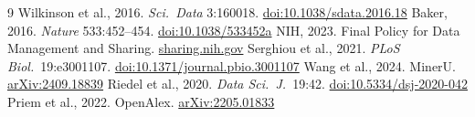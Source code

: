 \documentclass[a4paper,12pt]{article}
\begin{document}
\renewcommand{\refname}{\vspace{-0.5em}\normalsize References}
\renewcommand{\markboth}[2]{}
\begin{thebibliography}{9}\scriptsize\setlength{\itemsep}{1pt}\setlength{\parsep}{0pt}\setlength{\topsep}{0pt}
 Wilkinson et al., 2016. \textit{Sci.\ Data} 3:160018. \href{https://doi.org/10.1038/sdata.2016.18}{doi:10.1038/sdata.2016.18}
 Baker, 2016. \textit{Nature} 533:452--454. \href{https://doi.org/10.1038/533452a}{doi:10.1038/533452a}
 NIH, 2023. Final Policy for Data Management and Sharing. \href{https://sharing.nih.gov/data-management-and-sharing-policy}{sharing.nih.gov}
 Serghiou et al., 2021. \textit{PLoS Biol.}\ 19:e3001107. \href{https://doi.org/10.1371/journal.pbio.3001107}{doi:10.1371/journal.pbio.3001107}
 Wang et al., 2024. MinerU. \href{https://doi.org/10.48550/arXiv.2409.18839}{arXiv:2409.18839}
 Riedel et al., 2020. \textit{Data Sci.\ J.}\ 19:42. \href{https://doi.org/10.5334/dsj-2020-042}{doi:10.5334/dsj-2020-042}
 Priem et al., 2022. OpenAlex. \href{https://doi.org/10.48550/arXiv.2205.01833}{arXiv:2205.01833}
\end{thebibliography}
\end{document}
